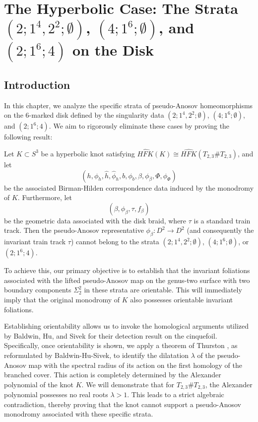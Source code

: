 \chapter{The Hyperbolic Case: The Strata \texorpdfstring{$(2;1^4,2^2;\emptyset)$}{(2;1^4,2^2;empty)}, \texorpdfstring{$(4;1^6;\emptyset)$}{(4;1^6;empty)}, and \texorpdfstring{$(2;1^6;4)$}{(2;1^6;4)} on the Disk}\label{chap:stratoriented}

\section{Introduction}

In this chapter, we analyze the specific strata of pseudo-Anosov homeomorphisms on the 6-marked disk defined by the singularity data $(2; 1^4, 2^2; \emptyset)$, $(4; 1^6; \emptyset)$, and $(2; 1^6; 4)$. We aim to rigorously eliminate these cases by proving the following result:

\begin{theorem}
    \label{thm:orientable_strata_elimination}
    Let $K \subset S^3$ be a hyperbolic knot satisfying $\widehat{HFK}(K) \cong \widehat{HFK}(T_{2,3} \# T_{2,3})$, and let
    \[
    (h, \phi_h, \hat{h}, \hat{\phi}_h, b, \phi_b, \beta, \phi_\beta, \Phi, \phi_\Phi)
    \]
    be the associated Birman-Hilden correspondence data induced by the monodromy of $K$. Furthermore, let
    \[
    (\beta, \phi_\beta, \tau, f_\beta)
    \]
    be the geometric data associated with the disk braid, where $\tau$ is a standard train track. Then the pseudo-Anosov representative $\phi_\beta \colon D^2 \to D^2$ (and consequently the invariant train track $\tau$) cannot belong to the strata $(2; 1^4, 2^2; \emptyset)$, $(4; 1^6; \emptyset)$, or $(2; 1^6; 4)$.
\end{theorem}

To achieve this, our primary objective is to establish that the invariant foliations associated with the lifted pseudo-Anosov map on the genus-two surface with two boundary components $\Sigma_2^2$ in these strata are orientable. This will immediately imply that the original monodromy of $K$ also possesses orientable invariant foliations.

Establishing orientability allows us to invoke the homological arguments utilized by Baldwin, Hu, and Sivek \cite{baldwin2025khovanov} for their detection result on the cinquefoil. Specifically, once orientability is shown, we apply a theorem of Thurston \cite{Thurston1988}, as reformulated by Baldwin-Hu-Sivek, to identify the dilatation $\lambda$ of the pseudo-Anosov map with the spectral radius of its action on the first homology of the branched cover. This action is completely determined by the Alexander polynomial of the knot $K$. We will demonstrate that for $T_{2,3} \# T_{2,3}$, the Alexander polynomial possesses no real roots $\lambda > 1$. This leads to a strict algebraic contradiction, thereby proving that the knot cannot support a pseudo-Anosov monodromy associated with these specific strata.

